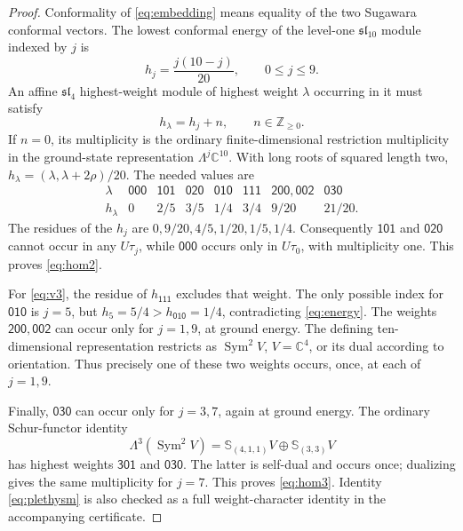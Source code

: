 \documentclass[11pt]{amsart}
\theoremstyle{remark}
\newcommand{\wt}[1]{\mathsf{#1}}
\begin{document}
\begin{proof}
Conformality of \eqref{eq:embedding} means equality of the two Sugawara
conformal vectors. The lowest conformal energy of the level-one
$\mathfrak{sl}_{10}$ module indexed by $j$ is
\[
 h_j=\frac{j(10-j)}{20},\qquad 0\leq j\leq9.
\]
An affine $\mathfrak{sl}_4$ highest-weight module of highest weight
$\lambda$ occurring in it must satisfy
\begin{equation}\label{eq:energy}
 h_\lambda=h_j+n,\qquad n\in\mathbb Z_{\geq0}.
\end{equation}
If $n=0$, its multiplicity is the ordinary finite-dimensional
restriction multiplicity in the ground-state representation
$\Lambda^j\mathbb C^{10}$. With long roots of squared length two,
$h_\lambda=(\lambda,\lambda+2\rho)/20$. The needed values are
\[
\begin{array}{c|rrrrrrr}
\lambda&\wt{000}&\wt{101}&\wt{020}&\wt{010}&\wt{111}
 &\wt{200},\wt{002}&\wt{030}\\ \hline
h_\lambda&0&2/5&3/5&1/4&3/4&9/20&21/20.
\end{array}
\]
The residues of the $h_j$ are
$0,9/20,4/5,1/20,1/5,1/4$. Consequently $\wt{101}$ and
$\wt{020}$ cannot occur in any $U\tau_j$, while $\wt{000}$ occurs
only in $U\tau_0$, with multiplicity one. This proves \eqref{eq:hom2}.

For \eqref{eq:v3}, the residue of $h_{\wt{111}}$ excludes that weight.
The only possible index for $\wt{010}$ is $j=5$, but
$h_5=5/4>h_{\wt{010}}=1/4$, contradicting \eqref{eq:energy}. The weights
$\wt{200},\wt{002}$ can occur only for $j=1,9$, at ground energy.
The defining ten-dimensional representation restricts as
$\operatorname{Sym}^2 V$, $V=\mathbb C^4$, or its dual according to
orientation. Thus precisely one of these two weights occurs, once, at
each of $j=1,9$.

Finally, $\wt{030}$ can occur only for $j=3,7$, again at ground energy.
The ordinary Schur-functor identity
\begin{equation}\label{eq:plethysm}
 \Lambda^3(\operatorname{Sym}^2 V)
 =\mathbb S_{(4,1,1)}V\oplus\mathbb S_{(3,3)}V
\end{equation}
has highest weights $\wt{301}$ and $\wt{030}$. The latter is self-dual
and occurs once; dualizing gives the same multiplicity for $j=7$.
This proves \eqref{eq:hom3}. Identity \eqref{eq:plethysm} is also checked
as a full weight-character identity in the accompanying certificate.
\end{proof}
\end{document}
